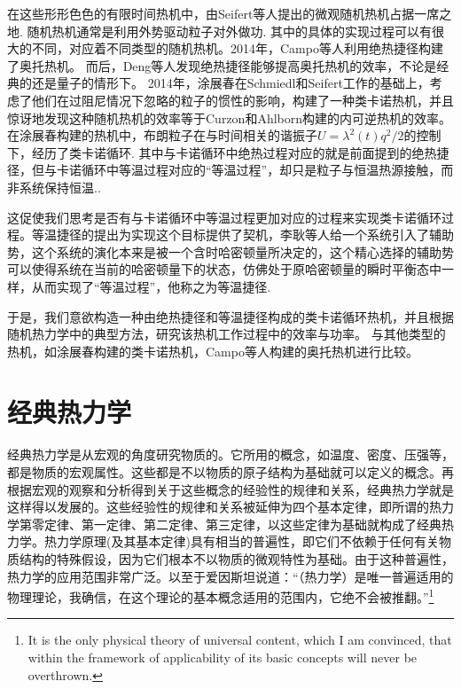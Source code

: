 在这些形形色色的有限时间热机中，由Seifert等人提出的微观随机热机\cite{Schmiedl2008}占据一席之地. 随机热机通常是利用外势驱动粒子对外做功. 其中的具体的实现过程可以有很大的不同，对应着不同类型的随机热机。2014年，Campo等人利用绝热捷径构建了奥托热机\cite{DelCampo2014}。 而后，Deng等人发现绝热捷径能够提高奥托热机的效率，不论是经典的还是量子的情形下。\cite{Deng2013} 2014年，涂展春在Schmiedl和Seifert工作\cite{Schmiedl2008}的基础上，考虑了他们在过阻尼情况下忽略的粒子的惯性的影响，构建了一种类卡诺热机\cite{Tu2013}，并且惊讶地发现这种随机热机的效率等于Curzon和Ahlborn构建的内可逆热机\cite{Curzon1975}的效率。在涂展春构建的热机中，布朗粒子在与时间相关的谐振子$U=\lambda ^2\left( t \right) q^2/2$的控制下，经历了类卡诺循环. 其中与卡诺循环中绝热过程对应的就是前面提到的绝热捷径，但与卡诺循环中等温过程对应的“等温过程”，却只是粒子与恒温热源接触，而非系统保持恒温..

这促使我们思考是否有与卡诺循环中等温过程更加对应的过程来实现类卡诺循环过程。等温捷径\cite{Li2016}的提出为实现这个目标提供了契机，李耿等人给一个系统引入了辅助势，这个系统的演化本来是被一个含时哈密顿量所决定的，这个精心选择的辅助势可以使得系统在当前的哈密顿量下的状态，仿佛处于原哈密顿量的瞬时平衡态中一样，从而实现了“等温过程”，他称之为等温捷径.

于是，我们意欲构造一种由绝热捷径和等温捷径构成的类卡诺循环热机，并且根据随机热力学中的典型方法，研究该热机工作过程中的效率与功率。 与其他类型的热机，如涂展春构建的类卡诺热机\cite{Tu2013}，Campo等人构建的奥托热机\cite{DelCampo2014}进行比较。
\section{经典热力学}

\qquad 经典热力学是从宏观的角度研究物质的。它所用的概念，如温度、密度、压强等，都是物质的宏观属性。这些都是不以物质的原子结构为基础就可以定义的概念。再根据宏观的观察和分析得到关于这些概念的经验性的规律和关系，经典热力学就是这样得以发展的。这些经验性的规律和关系被延伸为四个基本定律，即所谓的热力学第零定律、第一定律、第二定律、第三定律，以这些定律为基础就构成了经典热力学。热力学原理(及其基本定律)具有相当的普遍性，即它们不依赖于任何有关物质结构的特殊假设，因为它们根本不以物质的微观特性为基础。由于这种普遍性，热力学的应用范围非常广泛。以至于爱因斯坦说道\cite{schilpp1979albert}：“（热力学）是唯一普遍适用的物理理论，我确信，在这个理论的基本概念适用的范围内，它绝不会被推翻。”\footnote{It is the only physical theory of universal content, which I am convinced, that within the framework of applicability of its basic concepts will never be
overthrown.}

